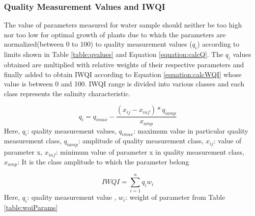 \documentclass[conference]{IEEEtran}
\begin{document}
\subsubsection{Quality Measurement Values and IWQI}
\label{subsubsection:calcIWQI}
The value of parameters measured for water sample should neither be too high nor too low for optimal growth of plants due to which the parameters are normalized(between 0 to 100) to quality measurement values ($q_i$) according to limits shown in Table \ref{table:qvalues}\cite{article:irrigationWaterQuality} and Equation \ref{equation:calcQ}. The $q_i$ values obtained are multiplied with relative weights of their respective parameters and finally added to obtain IWQI according to Equation \ref{equation:calcWQI} whose value is between 0 and 100. IWQI range is divided into various classes and each class represents the salinity characteristic. 




\begin{equation}
\label{equation:calcQ}
    q_i = q_{imax} - \frac{(x_{ij} - x_{inf})*q_{iamp}}{x_{amp}}
\end{equation} 
Here, \newline
$q_i$: quality measurement values, \newline
$q_{imax}$: maximum value in particular quality measurement class, \newline	
$q_{iamp}$: amplitude of quality measurement class, \newline
$x_{ij}$: value of parameter x, \newline
$x_{inf}$: minimum value of parameter x in quality measurement class, \newline
$x_{amp}$: It is the class amplitude to which the parameter belong 	

\begin{equation}
\label{equation:calcWQI}
    IWQI = \sum_{i=1}^{n}q_iw_i
\end{equation}
Here, \newline
$q_i$: quality measurement value , \newline
$w_i$: weight of parameter from Table \ref{table:wqiParams}
\end{document}
